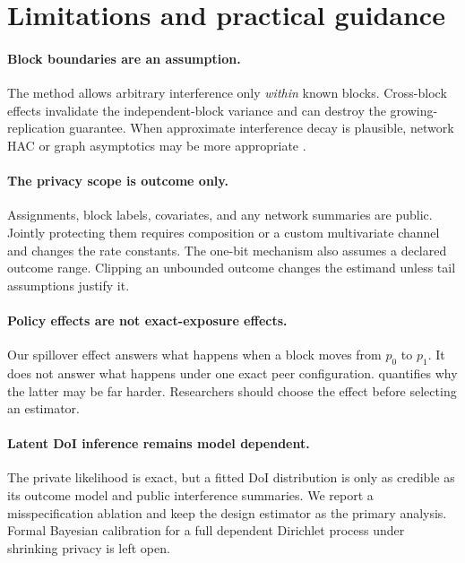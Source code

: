 \documentclass[10pt]{article}
\theoremstyle{definition}
\theoremstyle{remark}
\begin{document}
\FloatBarrier

\section{Limitations and practical guidance}
\label{sec:limitations}

\paragraph{Block boundaries are an assumption.}
The method allows arbitrary interference only \emph{within} known blocks. Cross-block effects
invalidate the independent-block variance and can destroy the growing-replication guarantee.
When approximate interference decay is plausible, network HAC or graph asymptotics may be more
appropriate \citep{Leung2020,Leung2022}.

\paragraph{The privacy scope is outcome only.}
Assignments, block labels, covariates, and any network summaries are public. Jointly protecting
them requires composition or a custom multivariate channel and changes the rate constants.
The one-bit mechanism also assumes a declared outcome range. Clipping an unbounded outcome
changes the estimand unless tail assumptions justify it.

\paragraph{Policy effects are not exact-exposure effects.}
Our spillover effect answers what happens when a block moves from $p_0$ to $p_1$. It does not
answer what happens under one exact peer configuration.  quantifies why the
latter may be far harder. Researchers should choose the effect before selecting an estimator.

\paragraph{Latent DoI inference remains model dependent.}
The private likelihood is exact, but a fitted DoI distribution is only as credible as its
outcome model and public interference summaries. We report a misspecification ablation and keep
the design estimator as the primary analysis. Formal Bayesian calibration for a full dependent
Dirichlet process under shrinking privacy is left open.
\end{document}
